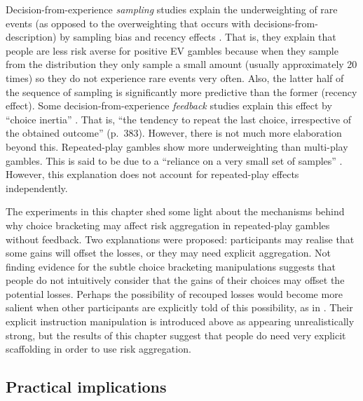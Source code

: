 \documentclass[a4paper, nobind, dvipsnames]{templates/ociamthesis}
\theoremstyle{definition}
\theoremstyle{definition}
\theoremstyle{definition}
\theoremstyle{definition}
\theoremstyle{remark}
\begin{document}
Decision-from-experience \emph{sampling} studies explain the underweighting of rare
events (as opposed to the overweighting that occurs with
decisions-from-description) by sampling bias and recency effects \autocites[e.g.,][]{hertwig2004,wulff2018}. That is, they explain that people are less risk
averse for positive EV gambles because when they sample from the distribution
they only sample a small amount (usually approximately 20 times) so they do not
experience rare events very often. Also, the latter half of the sequence of
sampling is significantly more predictive than the former (recency effect). Some
decision-from-experience \emph{feedback} studies explain this effect by ``choice
inertia'' \autocite{camilleri2011}. That is, ``the tendency to repeat the last choice,
irrespective of the obtained outcome'' (p.~383). However, there is not much more
elaboration beyond this. Repeated-play gambles show more underweighting than
multi-play gambles. This is said to be due to a ``reliance on a very small set of
samples'' \autocite[p.~64]{camilleri2013}. However, this explanation does not account for
repeated-play effects independently.

The experiments in this chapter shed some light about the mechanisms behind why
choice bracketing may affect risk aggregation in repeated-play gambles without
feedback. Two explanations were proposed: participants may realise that some
gains will offset the losses, or they may need explicit aggregation. Not finding
evidence for the subtle choice bracketing manipulations suggests that people do
not intuitively consider that the gains of their choices may offset the
potential losses. Perhaps the possibility of recouped losses would become more
salient when other participants are explicitly told of this possibility, as in
\textcite{sokolhessner2009}. Their explicit instruction manipulation is introduced above
as appearing unrealistically strong, but the results of this chapter suggest
that people do need very explicit scaffolding in order to use risk aggregation.

\subsection{Practical implications}
\end{document}
